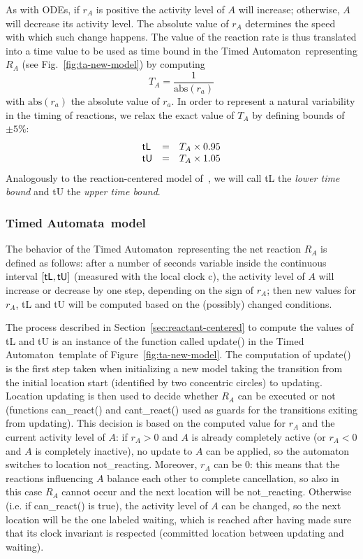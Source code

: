 \documentclass{bmcart}
\def\ta{Timed Automaton}
\def\tas{Timed Automata}
\begin{document}
As with ODEs, if $r_A$ is positive the activity level of $A$ will increase;
otherwise, $A$ will decrease its activity level.
The absolute value of $r_A$ determines the speed with which such change happens.
The value of the reaction rate is thus translated into a time value to be used as
time bound in the \ta\ representing $R_A$ (see Fig.~\ref{fig:ta-new-model}) by computing
$$T_A = \frac{1}{\mbox{abs}(r_a)}$$
with $\mbox{abs}(r_a)$ the absolute value of $r_a$. In order to represent
a natural variability in the timing of reactions, we relax the exact value of $T_A$ by
defining bounds of $\pm 5\%$:
$$
\begin{array}{lcl}
  \mbox{\sf tL} &=& T_A \times 0.95 \\
  \mbox{\sf tU} &=& T_A \times 1.05
\end{array}
$$
Analogously to the reaction-centered model of~\cite{animo-bibe},
we will call {\sf tL} the \emph{lower time bound} and {\sf tU} the \emph{upper time bound}.


\subsubsection*{\tas\ model}\label{sec:ta-model}
The behavior of the \ta\ representing the net reaction $R_A$ is defined as follows: after a number of seconds
variable inside the continuous interval $[\mbox{\sf tL}, \mbox{\sf tU}]$ (measured with the local clock {\sf c}),
the activity level of $A$ will increase or
decrease by one step, depending on the sign of $r_A$; then new values for $r_A$, {\sf tL} and {\sf tU} will be computed based
on the (possibly) changed conditions.

The process described in Section~\ref{sec:reactant-centered} to compute the values of {\sf tL} and {\sf tU} is an instance of the function called {\sf update()}
in the \ta\ template of Figure~\ref{fig:ta-new-model}. The computation of {\sf update()} is the first step
taken when initializing a new model taking the transition from the initial location {\sf start} (identified by two concentric circles)
to {\sf updating}.
Location {\sf updating} is then used to decide whether $R_A$ can be executed or not (functions
{\sf can\_react()} and {\sf cant\_react()} used as guards for the transitions exiting from {\sf updating}).
This decision is based on the computed value for
$r_A$ and the current activity level of $A$: if $r_A > 0$ and $A$ is already completely active
(or  $r_A < 0$ and $A$ is completely inactive), no
update to $A$ can be applied, so the automaton switches to location {\sf not\_reacting}.
Moreover, $r_A$ can be $0$: this means
that the reactions influencing $A$ balance each other to complete cancellation, so also in this
case $R_A$ cannot occur and the next location will be {\sf not\_reacting}. Otherwise (i.e. if {\sf can\_react()} is true), the activity
level of $A$ can be changed, so the next location will be the one labeled {\sf waiting}, which
is reached after having made sure that its clock invariant is respected (committed location
between {\sf updating} and {\sf waiting}).
\end{document}
